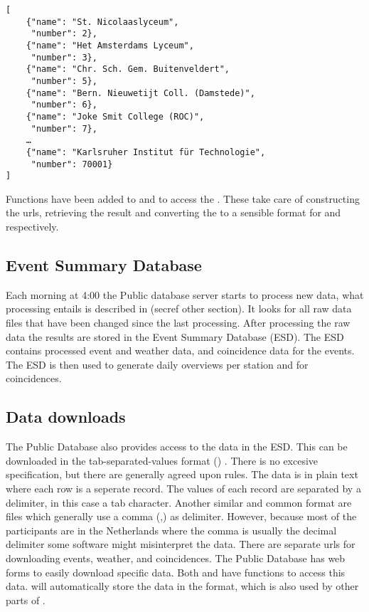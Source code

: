 \begin{verbatim}
[
    {"name": "St. Nicolaaslyceum",
     "number": 2},
    {"name": "Het Amsterdams Lyceum",
     "number": 3},
    {"name": "Chr. Sch. Gem. Buitenveldert",
     "number": 5},
    {"name": "Bern. Nieuwetijt Coll. (Damstede)",
     "number": 6},
    {"name": "Joke Smit College (ROC)",
     "number": 7},
    …
    {"name": "Karlsruher Institut für Technologie",
     "number": 70001}
]
\end{verbatim}

Functions have been added to \sapphire and \jsparc to access the \api. These take care of constructing the urls, retrieving the result and converting the \json to a sensible format for \python and \javascript respectively.


\subsection{Event Summary Database}

Each morning at 4:00 \utc the Public database server starts to process new data, what processing entails is described in (secref other section). It looks for all raw data files that have been changed since the last processing. After processing the raw data the results are stored in the Event Summary Database (ESD). The ESD contains processed event and weather data, and coincidence data for the events. The ESD is then used to generate daily overviews per station and for coincidences.


\subsection{Data downloads}

The Public Database also provides access to the data in the ESD. This can be downloaded in the tab-separated-values format (\tsv) \cite{ianatexttsv}. There is no excesive \tsv specification, but there are generally agreed upon rules. The data is in plain text where each row is a seperate record. The values of each record are separated by a delimiter, in this case a tab character. Another similar and common format are \csv files which generally use a comma (,) as delimiter. However, because most of the \hisparc participants are in the Netherlands where the comma is usually the decimal delimiter some software might misinterpret the data. There are separate urls for downloading events, weather, and coincidences. The Public Database has web forms to easily download specific data. Both \sapphire and \jsparc have functions to access this data. \sapphire will automatically store the data in the \hdf format, which is also used by other parts of \sapphire.


